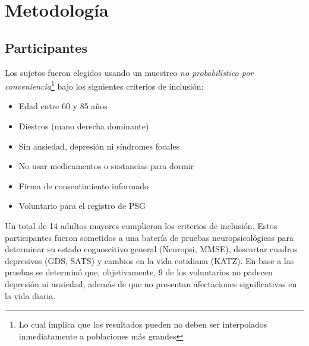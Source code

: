 \chapter{Metodología}


\section{Participantes}

Los sujetos fueron elegidos usando un muestreo \textit{no probabilístico por 
conveniencia}\footnote{Lo cual implica que los resultados pueden no deben ser interpolados 
inmediatamente a poblaciones más grandes} bajo los siguientes criterios de inclusión:
\begin{itemize}
\item Edad entre 60 y 85 años
\item Diestros (mano derecha dominante)
\item Sin ansiedad, depresión ni síndromes focales
\item No usar medicamentos o sustancias para dormir
\item Firma de consentimiento informado
\item Voluntario para el registro de PSG
\end{itemize}

Un total de 14 adultos mayores cumplieron los criterios de inclusión. Estos 
participantes fueron 
sometidos a una batería de pruebas neuropsicológicas para determinar su estado cognoscitivo general 
(Neuropsi, MMSE), descartar cuadros depresivos (GDS, SATS) y cambios en la vida cotidiana (KATZ).
En base a las pruebas se determinó que, objetivamente, 9 de los voluntarios no padecen depresión ni 
ansiedad, además de que no presentan afectaciones significativas en la vida diaria.

